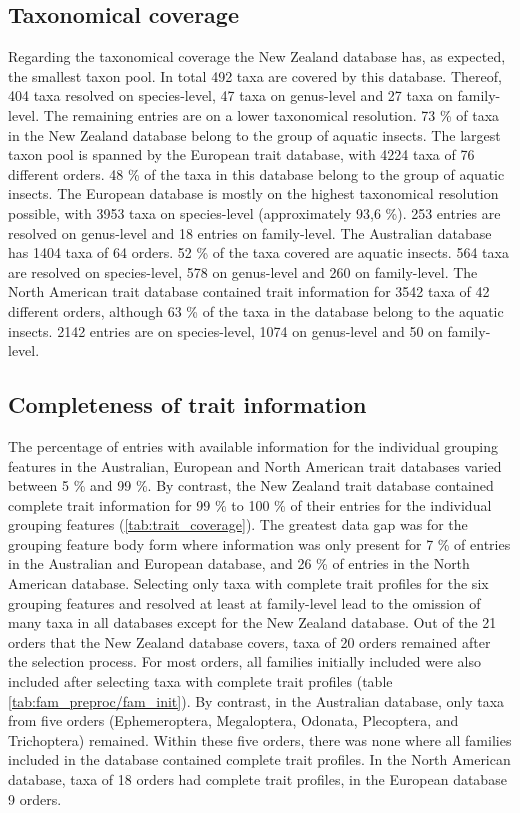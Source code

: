 \documentclass{article}
\begin{document}
\subsection{Taxonomical coverage}
Regarding the taxonomical coverage the New Zealand database has, as expected, the smallest 
taxon pool. In total 492 taxa are covered by this database. Thereof, 404 taxa resolved on species-level, 47 taxa 
on genus-level and 27 taxa on family-level. The remaining entries are on a lower taxonomical resolution. 
73 \% of taxa in the New Zealand database belong to the group of aquatic insects.
The largest taxon pool is spanned by the European trait database, with 4224 taxa of 76 different orders. 
48 \% of the taxa in this database belong to the group of aquatic insects. The European database is 
mostly on the highest taxonomical resolution possible, with 3953 taxa on species-level (approximately 93,6 \%).
253 entries are resolved on genus-level and 18 entries on family-level.
The Australian database has 1404 taxa of 64 orders. 52 \% of the taxa covered are aquatic insects. 
564 taxa are resolved on species-level, 578 on genus-level and 260 on family-level.
The North American trait database contained trait information for 3542 taxa of 42 different orders, 
although 63 \% of the taxa in the database belong to the aquatic insects. 2142 entries are on 
species-level, 1074 on genus-level and 50 on family-level. 

\subsection{Completeness of trait information}
The percentage of entries with available information for the individual grouping features in the Australian, European and
North American trait databases varied between 5 \% and 99 \%. By contrast, the New Zealand trait database
contained complete trait information for 99 \% to 100 \% of their entries for the individual grouping features (\ref{tab:trait_coverage}).
The greatest data gap was for the grouping feature body form where information was only present for 7 \% of entries
in the Australian and European database, and 26 \% of entries in the North American database. %
Selecting only taxa with complete trait profiles for the six grouping features and resolved at least at 
family-level lead to the omission of many taxa in all databases except for the New Zealand database. 
Out of the 21 orders that the New Zealand database covers, taxa of 20 orders remained after the selection process.
For most orders, all families initially included were also included after selecting taxa with complete trait profiles (table \ref{tab:fam_preproc/fam_init}).
By contrast, in the Australian database, only taxa from five orders (Ephemeroptera, Megaloptera, Odonata, Plecoptera, 
and Trichoptera) remained. Within these five orders, there was none where all families included in the database
contained complete trait profiles. %
In the North American database, taxa of 18 orders had complete trait profiles, in the European database 9 orders. 
\end{document}
